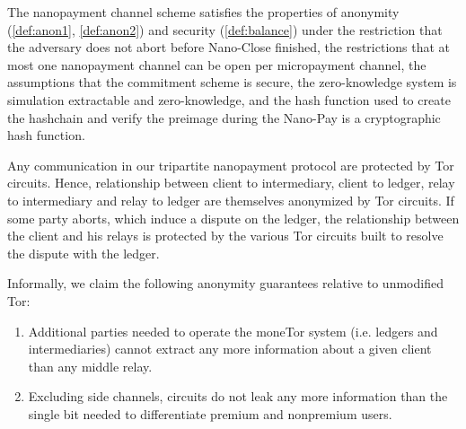 \begin{theorem}
The nanopayment channel scheme satisfies the properties of anonymity (\ref{def:anon1}, \ref{def:anon2})
 and security (\ref{def:balance}) under the restriction that the adversary does not abort before Nano-Close finished, the restrictions that at most one nanopayment channel can be open per micropayment channel, the assumptions that the commitment scheme is secure, the zero-knowledge system is simulation extractable and zero-knowledge, and the hash function used to create the hashchain and verify the preimage during the Nano-Pay is a cryptographic hash function.

\end{theorem}

Any communication in
our tripartite nanopayment protocol are protected by Tor circuits. Hence,
relationship between client to intermediary, client to ledger, relay to
intermediary and relay to ledger are themselves anonymized by Tor circuits. If
some party aborts, which induce a dispute on the ledger, the relationship
between the client and his relays is protected by the various Tor circuits built
to resolve the dispute with the ledger.

Informally, we claim the following anonymity guarantees relative to unmodified Tor:

\begin{enumerate}
\item Additional parties needed to operate the moneTor system (i.e. ledgers and
  intermediaries) cannot extract any more information about a given client than
  any middle relay.
\item Excluding side channels, circuits do not leak any more information than
  the single bit needed to differentiate premium and nonpremium users.
\end{enumerate}


